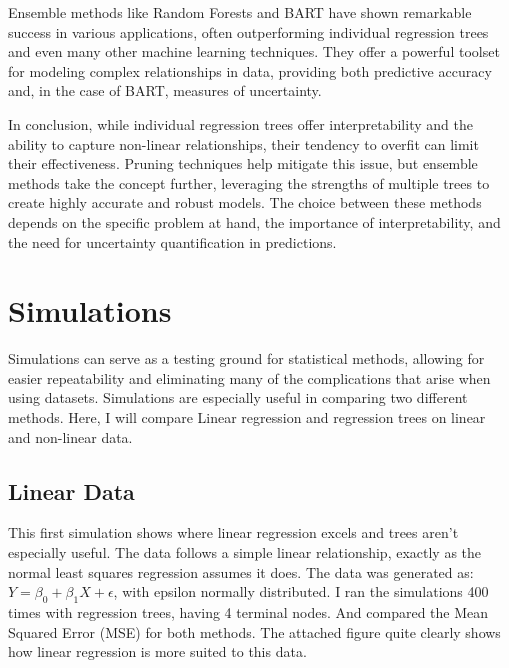\documentclass[12pt]{article}
\begin{document}
Ensemble methods like Random Forests and BART have shown remarkable success in various applications, often outperforming individual regression trees and even many other machine learning techniques. They offer a powerful toolset for modeling complex relationships in data, providing both predictive accuracy and, in the case of BART, measures of uncertainty.

In conclusion, while individual regression trees offer interpretability and the ability to capture non-linear relationships, their tendency to overfit can limit their effectiveness. Pruning techniques help mitigate this issue, but ensemble methods take the concept further, leveraging the strengths of multiple trees to create highly accurate and robust models. The choice between these methods depends on the specific problem at hand, the importance of interpretability, and the need for uncertainty quantification in predictions.





\section{Simulations}

Simulations can serve as a testing ground for statistical methods, allowing for easier repeatability and eliminating many of the complications that arise when using datasets. Simulations are especially useful in comparing two different methods. Here, I will compare Linear regression and regression trees on linear and non-linear data.

\subsection{Linear Data}


This first simulation shows where linear regression excels and trees aren't especially useful. The data follows a simple linear relationship, exactly as the normal least squares regression assumes it does. The data was generated as: $Y = \beta_0 + \beta_1X + \epsilon$, with epsilon normally distributed. I ran the simulations 400 times with regression trees, having 4 terminal nodes. And compared the Mean Squared Error (MSE) for both methods. The attached figure quite clearly shows how linear regression is more suited to this data.
\end{document}
